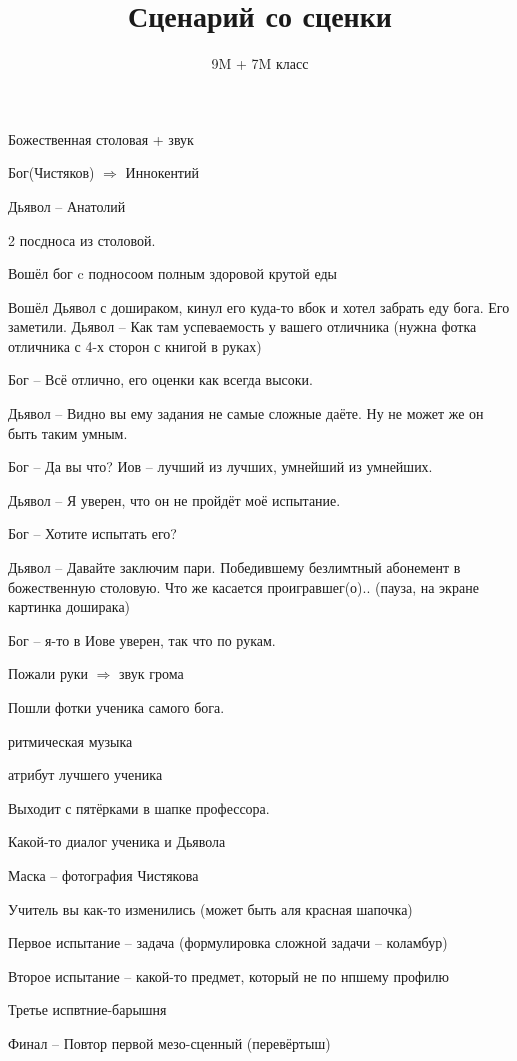 \documentclass[10pt,a4paper]{article}
\author{9M + 7M класс}
\title{Сценарий со сценки}
\begin{document}
 \maketitle
 Божественная столовая + звук 

Бог(Чистяков) $\Rightarrow$  Иннокентий

Дьявол  -- Анатолий 

2 посдноса из столовой.

Вошёл бог c подносоом полным здоровой крутой еды

Вошёл Дьявол с дошираком, кинул его куда-то вбок и хотел забрать еду бога. Его заметили.
Дьявол -- Как там успеваемость у вашего отличника (нужна фотка отличника с 4-х сторон с книгой в руках)

Бог -- Всё отлично, его оценки как всегда высоки.

Дьявол -- Видно вы ему задания не самые сложные даёте. Ну не может же он быть таким умным.

Бог -- Да вы что? Иов -- лучший из лучших, умнейший из умнейших.

Дьявол -- Я уверен, что он не пройдёт моё испытание.

Бог -- Хотите испытать его?

Дьявол -- Давайте заключим пари. Победившему безлимтный абонемент в божественную столовую. Что же касается проигравшег(о).. (пауза, на экране картинка доширака)

Бог -- я-то в Иове уверен, так что по рукам.

Пожали руки $\Rightarrow$ звук грома

Пошли фотки ученика самого бога. 

ритмическая музыка

атрибут лучшего ученика

Выходит с пятёрками в шапке профессора.

Какой-то диалог ученика и Дьявола

Маска -- фотография Чистякова

Учитель вы как-то изменились (может быть аля красная шапочка)

Первое испытание -- задача (формулировка сложной задачи -- коламбур)

Второе испытание -- какой-то предмет, который не по нпшему профилю

Третье испвтние-барышня

Финал -- Повтор первой мезо-сценный (перевёртыш)


 
\end{document}
